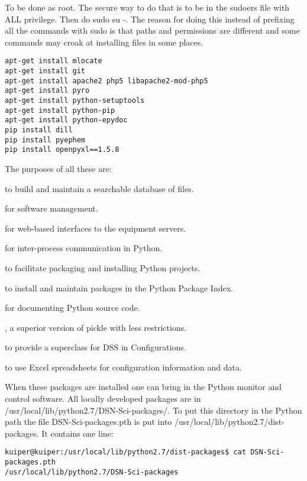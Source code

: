 \documentclass[letterpaper,11pt]{book}
\begin{document}
To be done as {\ttfamily root}.  The secure way to do that is to be in the
{\ttfamily sudoers} file with ALL privilege. Then do
{\ttfamily sudo su -}.  The reason for doing this instead of prefixing all the
commands with {\ttfamily sudo} is that paths and permissions are different and
some commands may croak at installing files in some places.
\begin{verbatim}
apt-get install mlocate
apt-get install git
apt-get install apache2 php5 libapache2-mod-php5
apt-get install pyro
apt-get install python-setuptools
apt-get install python-pip
apt-get install python-epydoc
pip install dill
pip install pyephem
pip install openpyxl==1.5.8\end{verbatim}
The purposes of all these are:
\begin{description}\itemsep0pt \parskip0pt 
\item [mlocate] to build and maintain a searchable database of files.
\item [git] for software management.
\item [apache2] for web-based interfaces to the equipment servers.
\item [pyro] for inter-process communication in Python.
\item [setuptools] to facilitate packaging and installing Python projects.
\item [pip] to install and maintain packages in the Python Package Index.
\item [epydoc] for documenting Python source code.
\item [dill], a superior version of {\ttfamily pickle} with less restrictions.
\item [pyephem] to provide a superclass for {\ttfamily DSS} in
{\ttfamily Configurations}.
\item [openpyxl] to use Excel spreadsheets for configuration information and
data.
\end{description}

When these packages are installed one can bring in the Python monitor and
control software. All locally developed packages are in
{\ttfamily /usr/local/lib/python2.7/DSN-Sci-packages/}.  To put this directory
in the Python path the file {\ttfamily DSN-Sci-packages.pth} is put into\linebreak
{\ttfamily /usr/local/lib/python2.7/dist-packages}.  It contains one line:
\begin{verbatim}
kuiper@kuiper:/usr/local/lib/python2.7/dist-packages$ cat DSN-Sci-packages.pth
/usr/local/lib/python2.7/DSN-Sci-packages\end{verbatim}
\end{document}
